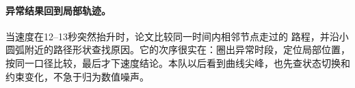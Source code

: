 \paragraph{异常结果回到局部轨迹。}
当速度在12--13秒突然抬升时，论文比较同一时间内相邻节点走过的
路程，并沿小圆弧附近的路径形状查找原因。它的次序很实在：圈出异常时段，定位局部位置，
按同一口径比较，最后才下速度结论。本队以后看到曲线尖峰，也先查状态切换和约束变化，不急于归为数值噪声。

